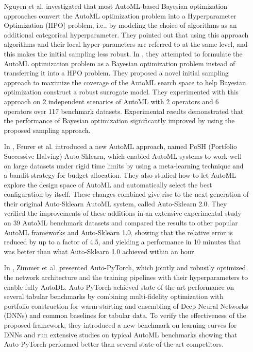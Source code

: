 Nguyen et al. investigated that most AutoML-based Bayesian optimization approaches convert the AutoML optimization problem into a Hyperparameter Optimization (HPO) problem, i.e., by modeling the choice of algorithms as an additional categorical hyperparameter.
They pointed out that using this approach algorithms and their local hyper-parameters are referred to at the same level, and this makes the initial sampling less robust.
In \cite{9660073}, they attempted to formulate the AutoML optimization problem as a Bayesian optimization problem instead of transferring it into a HPO problem.
They proposed a novel initial sampling approach to maximize the coverage of the AutoML search space to help Bayesian optimization construct a robust surrogate model.
They experimented with this approach on 2 independent scenarios of AutoML with 2 operators and 6 operators over 117 benchmark datasets.
Experimental results demonstrated that the performance of Bayesian optimization significantly improved by using the proposed sampling approach.

In \cite{Feurer2020}, Feurer et al. introduced a new AutoML approach, named PoSH (Portfolio Successive Halving) Auto-Sklearn, which enabled AutoML systems to work well on large datasets under rigid time limits by using a meta-learning technique and a bandit strategy for budget allocation.
They also studied how to let AutoML explore the design space of AutoML and automatically select the best configuration by itself.
These changes combined give rise to the next generation of their original Auto-Sklearn AutoML system, called Auto-Sklearn 2.0.
They verified the improvements of these additions in an extensive experimental study on 39 AutoML benchmark datasets and compared the results to other popular AutoML frameworks and Auto-Sklearn 1.0, showing that the relative error is reduced by up to a factor of 4.5, and yielding a performance in 10 minutes that was better than what Auto-Sklearn 1.0 achieved within an hour.

In \cite{Zimmer2020}, Zimmer et al. presented Auto-PyTorch, which jointly and robustly optimized the network architecture and the training pipelines with their hyperparameters to enable fully AutoDL.
Auto-PyTorch achieved state-of-the-art performance on several tabular benchmarks by combining multi-fidelity optimization with portfolio construction for warm starting and ensembling of Deep Neural Networks (DNNs) and common baselines for tabular data.
To verify the effectiveness of the proposed framework, they introduced a new benchmark on learning curves for DNNs and run extensive studies on typical AutoML benchmarks showing that Auto-PyTorch performed better than several state-of-the-art competitors.

